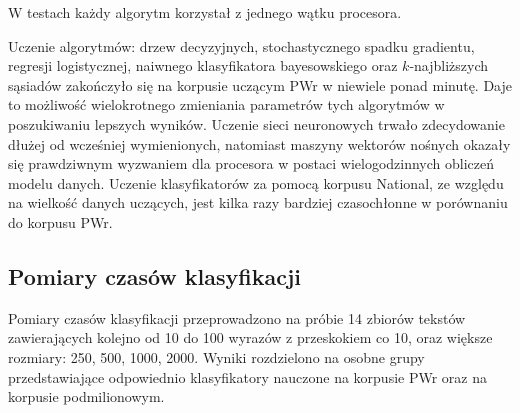 W testach każdy algorytm korzystał z jednego wątku procesora.

Uczenie algorytmów: drzew decyzyjnych, stochastycznego spadku gradientu, regresji logistycznej, naiwnego klasyfikatora bayesowskiego oraz $k$-najbliższych sąsiadów zakończyło się na korpusie uczącym PWr w niewiele ponad minutę. Daje to możliwość wielokrotnego zmieniania parametrów tych algorytmów w poszukiwaniu lepszych wyników. Uczenie sieci neuronowych trwało zdecydowanie dłużej od wcześniej wymienionych, natomiast maszyny wektorów nośnych okazały się prawdziwnym wyzwaniem dla procesora w postaci wielogodzinnych obliczeń modelu danych. Uczenie klasyfikatorów za pomocą korpusu National, ze względu na wielkość danych uczących, jest kilka razy bardziej czasochłonne w porównaniu do korpusu PWr.

\subsection{Pomiary czasów klasyfikacji}

Pomiary czasów klasyfikacji przeprowadzono na próbie 14 zbiorów tekstów zawierających kolejno od 10 do 100 wyrazów z przeskokiem co 10, oraz większe rozmiary: 250, 500, 1000, 2000. Wyniki rozdzielono na osobne grupy przedstawiające odpowiednio klasyfikatory nauczone na korpusie PWr oraz na korpusie podmilionowym.

\newpage

